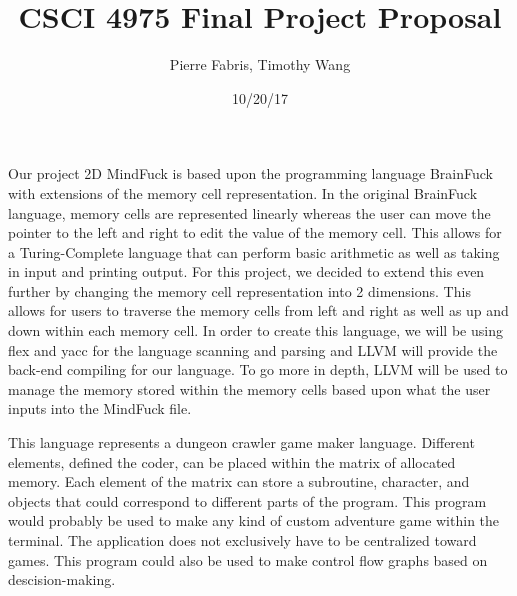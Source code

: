 \documentclass[]{article}
\title{\textbf{CSCI 4975 Final Project Proposal}}
\author{Pierre Fabris, Timothy Wang}
\date{10/20/17}
\begin{document}
    \maketitle
Our project 2D MindFuck is based upon the programming language BrainFuck with extensions of the memory
cell representation. In the original BrainFuck language, memory cells are represented linearly whereas 
the user can move the pointer to the left and right to edit the value of the memory cell. This allows 
for a Turing-Complete language that can perform basic arithmetic as well as taking in input and printing
output. For this project, we decided to extend this even further by changing the memory cell representation
into 2 dimensions. This allows for users to traverse the memory cells from left and right as well as up and
down within each memory cell. In order to create this language, we will be using flex and yacc for the 
language scanning and parsing and LLVM will provide the back-end compiling for our language. To go more in depth,
LLVM will be used to manage the memory stored within the memory cells based upon what the user inputs into the 
MindFuck file. 


This language represents a dungeon crawler game maker language.
Different elements, defined the coder, can be placed within the matrix of allocated memory.
Each element of the matrix can store a subroutine, character, and objects that could correspond to different parts of the program.
This program would probably be used to make any kind of custom adventure game within the terminal.
The application does not exclusively have to be centralized toward games.
This program could also be used to make control flow graphs based on descision-making.
\end{document}
